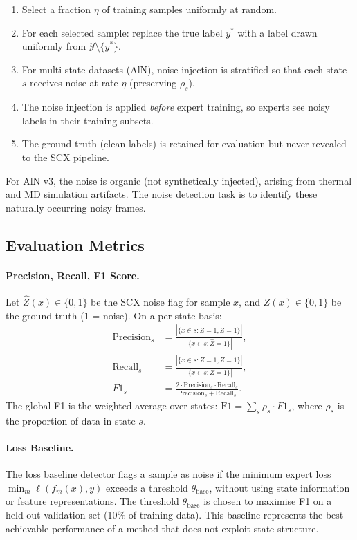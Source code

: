 \documentclass[article]{amsart}
\theoremstyle{definition}
\begin{document}
\begin{enumerate}
    \item Select a fraction $\eta$ of training samples uniformly at random.
    \item For each selected sample: replace the true label $y^*$ with a label drawn uniformly from $\mathcal{Y} \setminus \{y^*\}$.
    \item For multi-state datasets (AlN), noise injection is stratified so that each state $s$ receives noise at rate $\eta$ (preserving $\rho_s$).
    \item The noise injection is applied \emph{before} expert training, so experts see noisy labels in their training subsets.
    \item The ground truth (clean labels) is retained for evaluation but never revealed to the SCX pipeline.
\end{enumerate}

For AlN v3, the noise is organic (not synthetically injected), arising from thermal and MD simulation artifacts. The noise detection task is to identify these naturally occurring noisy frames.

\subsection{Evaluation Metrics}

\paragraph{Precision, Recall, F1 Score.}
Let $\hat{Z}(x) \in \{0,1\}$ be the SCX noise flag for sample $x$, and $Z(x) \in \{0,1\}$ be the ground truth (1 = noise). On a per-state basis:
\begin{align}
\text{Precision}_s &= \frac{|\{x \in s: \hat{Z}=1, Z=1\}|}{|\{x \in s: \hat{Z}=1\}|}, \\
\text{Recall}_s &= \frac{|\{x \in s: \hat{Z}=1, Z=1\}|}{|\{x \in s: Z=1\}|}, \\
F1_s &= \frac{2 \cdot \text{Precision}_s \cdot \text{Recall}_s}{\text{Precision}_s + \text{Recall}_s}.
\end{align}
The global F1 is the weighted average over states: $\mathrm{F1} = \sum_s \rho_s \cdot F1_s$, where $\rho_s$ is the proportion of data in state $s$.

\paragraph{Loss Baseline.}
The loss baseline detector flags a sample as noise if the minimum expert loss $\min_m \ell(f_m(x), y)$ exceeds a threshold $\theta_{\text{base}}$, without using state information or feature representations. The threshold $\theta_{\text{base}}$ is chosen to maximise F1 on a held-out validation set (10\% of training data). This baseline represents the best achievable performance of a method that does not exploit state structure.
\end{document}

